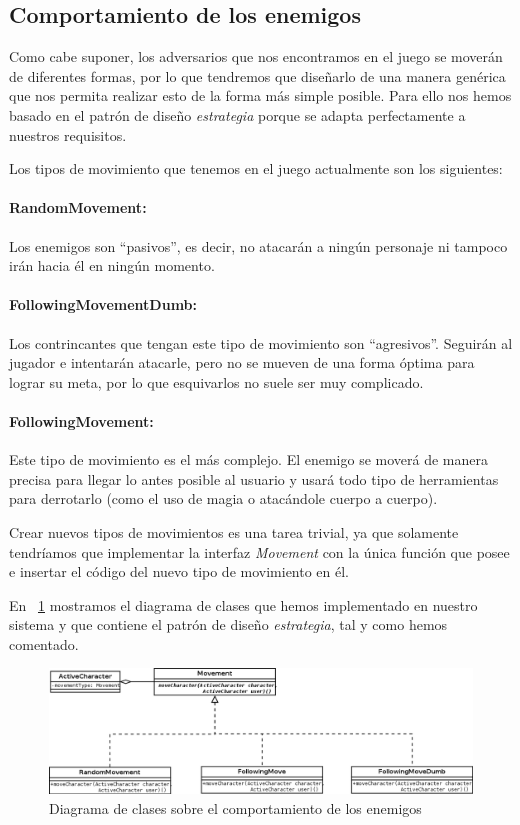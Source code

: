 \subsection{Comportamiento de los enemigos}
\label{sec:ia}

Como cabe suponer, los adversarios que nos encontramos en el juego se moverán de diferentes formas, por lo que tendremos que diseñarlo de una manera genérica que nos permita realizar esto de la forma más simple posible.
Para ello nos hemos basado en el patrón de diseño \textit{estrategia} porque se adapta perfectamente a nuestros requisitos.

Los tipos de movimiento que tenemos en el juego actualmente son los siguientes:

\paragraph{RandomMovement:} Los enemigos son ``pasivos'', es decir, no atacarán a ningún personaje ni tampoco irán hacia él en ningún momento.

\paragraph{FollowingMovementDumb:} Los contrincantes que tengan este tipo de movimiento son ``agresivos''. Seguirán al jugador e intentarán atacarle, pero no se mueven de una forma óptima para lograr su meta, por lo que esquivarlos no suele ser muy complicado.

\paragraph{FollowingMovement:} Este tipo de movimiento es el más complejo. El enemigo se moverá de manera precisa para llegar lo antes posible al usuario y usará todo tipo de herramientas para derrotarlo (como el uso de magia o atacándole cuerpo a cuerpo).

Crear nuevos tipos de movimientos es una tarea trivial, ya que solamente tendríamos que implementar la interfaz \textit{Movement} con la única función que posee e insertar el código del nuevo tipo de movimiento en él.

En ~\ref{fig:iaenemy} mostramos el diagrama de clases que hemos implementado en nuestro sistema y que contiene el patrón de diseño \textit{estrategia}, tal y como hemos comentado.

\begin{figure}
    \includegraphics[width=\textwidth,height=\textheight,keepaspectratio]{./img/iaenemy.png}
  \caption{Diagrama de clases sobre el comportamiento de los enemigos}
  \label{fig:iaenemy}
\end{figure}

